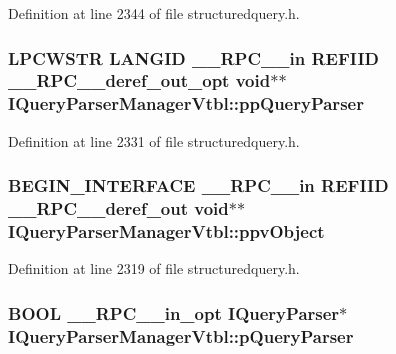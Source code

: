 Definition at line 2344 of file structuredquery.\+h.

\subsubsection[{\texorpdfstring{pp\+Query\+Parser}{ppQueryParser}}]{ {\bf L\+P\+C\+W\+S\+TR} L\+A\+N\+G\+ID {\bf \+\_\+\+\_\+\+R\+P\+C\+\_\+\+\_\+in} {\bf R\+E\+F\+I\+ID} {\bf \+\_\+\+\_\+\+R\+P\+C\+\_\+\+\_\+deref\+\_\+out\+\_\+opt} {\bf void}$\ast$$\ast$ I\+Query\+Parser\+Manager\+Vtbl\+::pp\+Query\+Parser}\hypertarget{struct_i_query_parser_manager_vtbl_a097ee7bd0a045ae057c52de25e7fa918}{}\label{struct_i_query_parser_manager_vtbl_a097ee7bd0a045ae057c52de25e7fa918}


Definition at line 2331 of file structuredquery.\+h.

\subsubsection[{\texorpdfstring{ppv\+Object}{ppvObject}}]{\setlength{\rightskip}{0pt plus 5cm}B\+E\+G\+I\+N\+\_\+\+I\+N\+T\+E\+R\+F\+A\+CE {\bf \+\_\+\+\_\+\+R\+P\+C\+\_\+\+\_\+in} {\bf R\+E\+F\+I\+ID} {\bf \+\_\+\+\_\+\+R\+P\+C\+\_\+\+\_\+deref\+\_\+out} {\bf void}$\ast$$\ast$ I\+Query\+Parser\+Manager\+Vtbl\+::ppv\+Object}\hypertarget{struct_i_query_parser_manager_vtbl_a0bc963e49a85e0ed532badc6649022f5}{}\label{struct_i_query_parser_manager_vtbl_a0bc963e49a85e0ed532badc6649022f5}


Definition at line 2319 of file structuredquery.\+h.

\subsubsection[{\texorpdfstring{p\+Query\+Parser}{pQueryParser}}]{ {\bf B\+O\+OL} {\bf \+\_\+\+\_\+\+R\+P\+C\+\_\+\+\_\+in\+\_\+opt} {\bf I\+Query\+Parser}$\ast$ I\+Query\+Parser\+Manager\+Vtbl\+::p\+Query\+Parser}\hypertarget{struct_i_query_parser_manager_vtbl_a0114f3abfec80ef1bf6909c5accc90f2}{}\label{struct_i_query_parser_manager_vtbl_a0114f3abfec80ef1bf6909c5accc90f2}


